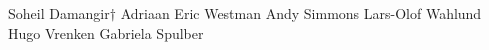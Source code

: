 Soheil Damangir$\dag$
Adriaan
Eric Westman 
Andy Simmons
Lars-Olof Wahlund
Hugo Vrenken
Gabriela Spulber
  